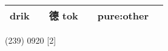 \documentclass[14pt,a4paper]{scrartcl}
\begin{document}
\begin{longtable}[c]{@{}llllll@{}}
\begin{minipage}[t]{0.14\columnwidth}
drik
\strut\end{minipage} &
\begin{minipage}[t]{0.14\columnwidth}\raggedright\strut
\strut\end{minipage} &
\begin{minipage}[t]{0.14\columnwidth}\raggedright\strut
德 tok
\strut\end{minipage} &
\begin{minipage}[t]{0.14\columnwidth}\raggedright\strut
\strut\end{minipage} &
\begin{minipage}[t]{0.14\columnwidth}\raggedright\strut
pure:other
\strut\end{minipage}\tabularnewline
\bottomrule
\end{longtable}

(239) 0920 {[}2{]}
\end{document}
